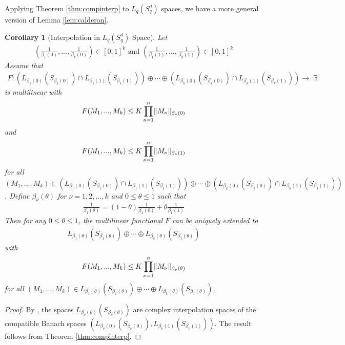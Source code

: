 \documentclass[11pt]{amsart}
\numberwithin{equation}{section}
\numberwithin{equation}{section}
\DeclareMathOperator{\R}{\mathbb{R}}
\DeclarePairedDelimiter{\norm}{\lVert}{\rVert}
\newtheorem{corollary}[theorem]{Corollary}
\theoremstyle{remark}
\theoremstyle{definition}
\begin{document}
Applying Theorem \ref{thm:compinterp} to $L_q(S_q^d)$ spaces, we have a more general version of Lemma \ref{lem:calderon}.
\begin{corollary}[Interpolation in $L_q(S_q^d)$ Space]\label{cor:spinterpo}
    Let\begin{align*}(\frac{1}{\beta_{1}(0)},...,\frac{1}{\beta_{k}(0)}) \in [0,1]^k \text{ and }(\frac{1}{\beta_{1}(1)},...,\frac{1}{\beta_{k}(1)}) \in [0,1]^k\end{align*} Assume that
    \begin{align*}
        F: (L_{\beta_{1}(0)}(S_{\beta_{1}(0)}) \cap L_{\beta_{1}(1)}(S_{\beta_{1}(1)})) \oplus \cdots \oplus (L_{\beta_{k}(0)}(S_{\beta_{k}(0)}) \cap L_{\beta_{k}(1)}(S_{\beta_{k}(1)})) \to \R
    \end{align*}
    is multilinear with
    \begin{align*}
        F(M_1,...,M_k) \le K \prod \limits_{\nu=1}^{n} \norm{M_{\nu}}_{\beta_{\nu}(0)}
    \end{align*}
    and
    \begin{align*}
        F(M_1,...,M_k) \le K \prod \limits_{\nu=1}^{n} \norm{M_{\nu}}_{\beta_{\nu}(1)}
    \end{align*}
    for all $(M_1,...,M_k) \in (L_{\beta_{1}(0)}(S_{\beta_{1}(0)}) \cap L_{\beta_{1}(1)}(S_{\beta_{1}(1)})) \oplus \cdots \oplus (L_{\beta_{k}(0)}(S_{\beta_{1}(0)}) \cap L_{\beta_{k}(1)}(S_{\beta_{1}(1)}))$.
Define $\beta_{\nu}(\theta)$ for $\nu=1,2,...,k$  and $0 \le \theta \le 1$ such that
\begin{align*}
    \frac{1}{\beta_{1}(\theta)}=(1-\theta)\frac{1}{\beta_{1}(0)}+\theta \frac{1}{\beta_{1}(1)}
\end{align*}
    Then for any $0 \le \theta \le 1$, the multilinear functional $F$ can be uniquely extended to \begin{align*}L_{\beta_{1}(\theta)}(S_{\beta_{1}(\theta)})  \oplus \cdots \oplus L_{\beta_{k}(\theta)}(S_{\beta_{1}(\theta)}) \end{align*} with
    \begin{align*}
        F(M_1,...,M_k) \le K \prod \limits_{\nu=1}^{n} \norm{M_{\nu}}_{\beta_{\nu}(\theta)}
    \end{align*}
    for all $(M_1,...,M_k) \in L_{\beta_{1}(\theta)}(S_{\beta_{1}(\theta)})  \oplus \cdots \oplus L_{\beta_{k}(\theta)}(S_{\beta_{1}(\theta)}) $.
\end{corollary}
\begin{proof}
    By \cite{pisier2003non}, the spaces $L_{\beta_{\nu}(\theta)}(S_{\beta_{\nu}(\theta)})$ are complex interpolation spaces of the compatible Banach spaces $(L_{\beta_{\nu}(0)}(S_{\beta_{\nu}(0)}),L_{\beta_{\nu}(1)}(S_{\beta_{\nu}(1)}))$. The result follows from Theorem \ref{thm:compinterp}.
\end{proof}
\end{document}
